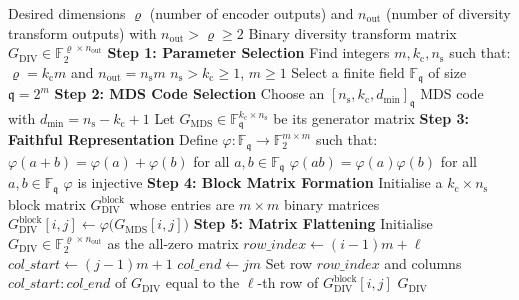\documentclass[journal]{IEEEtran}
\begin{document}
\begin{algorithm}
\caption{Construction of Diversity Transform Matrix from MDS Codes}
\label{alg:div_transform_construction}
\begin{algorithmic}[1]
\Require Desired dimensions $\varrho$ (number of encoder outputs) 
and $n_{\text{out}}$ (number of diversity transform outputs) with 
$n_{\text{out}} > \varrho \geq 2$
\Ensure Binary diversity transform matrix 
$G_{\text{DIV}} \in \mathbb{F}_{2}^{\varrho \times n_{\text{out}}}$
\Statex
{}
    \State \textbf{Step 1: Parameter Selection}
    \State Find integers $m, k_{\mathrm{c}}, n_{\mathrm{s}}$ such that:
    \State \quad $\varrho = k_{\mathrm{c}} m$ and 
    $n_{\text{out}} = n_{\mathrm{s}} m$
    \State \quad $n_{\mathrm{s}} > k_{\mathrm{c}} \geq 1$, $m \geq 1$
    \State Select a finite field $\mathbb{F}_{\mathfrak{q}}$ of size 
    $\mathfrak{q} = 2^{m}$
    \State \textbf{Step 2: MDS Code Selection}
    \State Choose an $[n_{\mathrm{s}}, k_{\mathrm{c}}, 
    d_{\min}]_{\mathfrak{q}}$ MDS code with 
    $d_{\min} = n_{\mathrm{s}}-k_{\mathrm{c}}+1$
    \State Let $G_{\text{MDS}} \in 
    \mathbb{F}_{\mathfrak{q}}^{k_{\mathrm{c}} \times n_{\mathrm{s}}}$ 
    be its generator matrix
    \State \textbf{Step 3: Faithful Representation}
    \State Define $\varphi: \mathbb{F}_{\mathfrak{q}} \rightarrow 
    \mathbb{F}_{2}^{m \times m}$ such that:
    \State \quad $\varphi(a + b) = \varphi(a) + \varphi(b)$ for all 
    $a,b \in \mathbb{F}_{\mathfrak{q}}$
    \State \quad $\varphi(ab) = \varphi(a)\varphi(b)$ for all 
    $a,b \in \mathbb{F}_{\mathfrak{q}}$
    \State \quad $\varphi$ is injective
    \State \textbf{Step 4: Block Matrix Formation}
    \State Initialise a $k_{\mathrm{c}} \times n_{\mathrm{s}}$ block 
    matrix $G_{\text{DIV}}^{\mathrm{block}}$ whose entries are 
    $m \times m$ binary matrices
            \State $G_{\text{DIV}}^{\mathrm{block}}[i,j] \gets 
            \varphi\bigl(G_{\text{MDS}}[i,j]\bigr)$
        \EndFor
    \EndFor
    \State \textbf{Step 5: Matrix Flattening}
    \State Initialise $G_{\text{DIV}} \in 
    \mathbb{F}_{2}^{\varrho \times n_{\text{out}}}$ as the all-zero 
    matrix
                \State $row\_index \gets (i-1)m + \ell$
                \State $col\_start \gets (j-1)m + 1$
                \State $col\_end \gets j m$
                \State Set row $row\_index$ and columns 
                $col\_start{:}col\_end$ of $G_{\text{DIV}}$ equal 
                to the $\ell$-th row of 
                $G_{\text{DIV}}^{\mathrm{block}}[i,j]$
            \EndFor
        \EndFor
    \EndFor
    \State \Return $G_{\text{DIV}}$
\EndProcedure
\end{algorithmic}
\end{algorithm}
\end{document}
